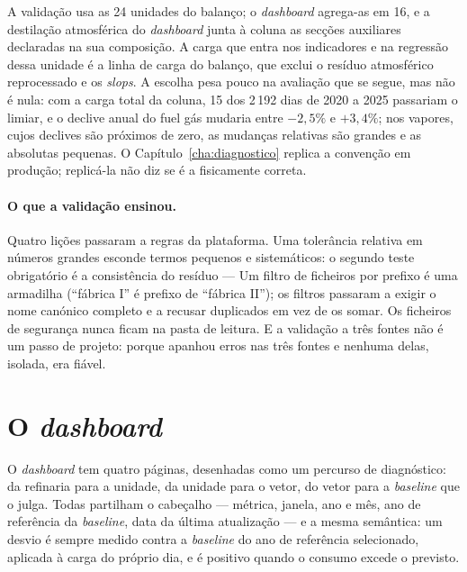 A validação usa as 24 unidades do balanço; o \emph{dashboard} agrega-as em 16,
e a destilação atmosférica do \emph{dashboard} junta à coluna as secções
auxiliares declaradas na sua composição.  A carga que entra nos indicadores
e na regressão dessa unidade é a linha de carga do balanço, que exclui o
resíduo atmosférico reprocessado e os \emph{slops}. A escolha pesa pouco na
avaliação que se segue, mas não é nula: com a carga total da coluna, 15 dos
2\,192 dias de 2020 a 2025 passariam o limiar, e o declive anual do fuel gás
mudaria entre $-2{,}5\%$ e $+3{,}4\%$; nos vapores, cujos declives são
próximos de zero, as mudanças relativas são grandes e as absolutas
pequenas. O Capítulo~\ref{cha:diagnostico} replica a convenção em produção;
replicá-la não diz se é a fisicamente correta.

\paragraph{O que a validação ensinou.} Quatro lições passaram a regras
da plataforma. Uma tolerância relativa em números grandes esconde termos
pequenos e sistemáticos: o segundo teste obrigatório é a consistência do
resíduo ---  Um filtro de ficheiros por prefixo
é uma armadilha (``fábrica I'' é prefixo de ``fábrica II''); os filtros
passaram a exigir o nome canónico completo e a recusar duplicados em vez
de os somar. Os ficheiros de segurança nunca ficam na pasta de leitura. E
a validação a três fontes não é um passo de projeto:  porque
apanhou erros nas três fontes e nenhuma delas, isolada, era fiável.

\section{O \emph{dashboard}}
\label{sec:dashboard}

O \emph{dashboard} tem quatro páginas, desenhadas como um percurso de
diagnóstico: da refinaria para a unidade, da unidade para o vetor, do
vetor para a \emph{baseline} que o julga. Todas partilham o cabeçalho
--- métrica, janela, ano e mês, ano de referência da \emph{baseline}, data
da última atualização --- e a mesma semântica: um desvio é sempre medido
contra a \emph{baseline} do ano de referência selecionado, aplicada à carga
do próprio dia, e é positivo quando o consumo excede o previsto.

